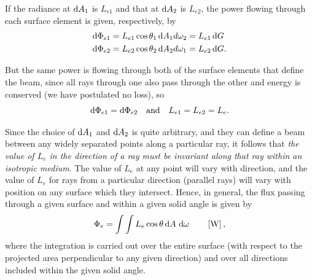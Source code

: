 \begin{refsection}
If the radiance at $\mathop{}\!\mathrm{d} A_1$ is $L_{e1}$ and that at $\mathop{}\!\mathrm{d} A_2$ is $L_{e2}$, the power
flowing
through each surface element is given, respectively, by
\begin{align}
\mathop{}\!\mathrm{d} \Phi_{e1} &= L_{e1} \cos\theta_1 \mathop{}\!\mathrm{d} A_1 d\omega_2 = L_{e1} \mathop{}\!\mathrm{d} G \nonumber\\
\mathop{}\!\mathrm{d} \Phi_{e2} &= L_{e2} \cos\theta_2 \mathop{}\!\mathrm{d} A_2 d\omega_1 = L_{e2} \mathop{}\!\mathrm{d} G.
\end{align}

But the same power is flowing through both of the surface elements that define
the
beam, since all rays through one also pass through the other and energy is
conserved
(we have postulated no loss), so
\begin{equation}
\mathop{}\!\mathrm{d} \Phi_{e1} = \mathop{}\!\mathrm{d} \Phi_{e2}\quad \textrm{and} \quad L_{e1} = L_{e2} = L_e.
\end{equation}

Since the choice of $\mathop{}\!\mathrm{d} A_1$ and $\mathop{}\!\mathrm{d} A_2$ is quite arbitrary, and they can define a
beam between any widely separated points along a particular ray, it follows that
\emph{the value of $L_e$ in the direction of a ray must be invariant along that
ray within an isotropic medium}.
The value of $L_e$ at any point will vary with direction, and the value of $L_e$
for rays from a particular direction (parallel rays) will vary with position on
any surface which they intersect. Hence, in general, the flux passing through a
given surface and within a given solid
angle is given by
\begin{equation}\label{eqn:nicodemus12}
\Phi_e = \int \int L_e \cos\theta \d A \, \d \omega
\qquad \left[\unit{\watt}\right],
\end{equation}
where the integration is carried out over the entire surface (with respect to
the projected area perpendicular to any given direction) and over all directions
included within the given solid angle.


\end{refsection}
